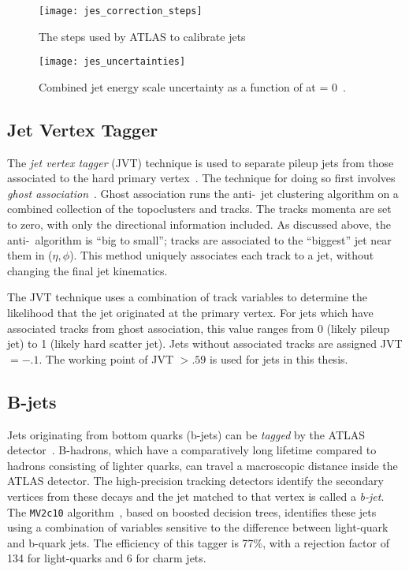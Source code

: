 \begin{figure}
\caption{The steps used by ATLAS to calibrate jets} \label{fig:jes_correction_steps}
\texttt{[image: jes\_correction\_steps]}
\end{figure}


\begin{figure}
\caption{Combined jet energy scale uncertainty as a function of \pt at \eta = 0~\cite{ATL-PHYS-PUB-2015-014,ATL-PHYS-PUB-2015-015}.} \label{fig:jes_uncertainties}
\texttt{[image: jes\_uncertainties]}
\end{figure}

\subsection{Jet Vertex Tagger}

The \textit{jet vertex tagger} (JVT) technique is used to separate pileup jets from those associated to the hard primary vertex~\cite{ATLAS-CONF-2014-018}.
The technique for doing so first involves \textit{ghost association}~\cite{Cacciari:2008gn}.
Ghost association runs the anti-\kt~jet clustering algorithm on a combined collection of the topoclusters and tracks.
The tracks momenta are set to zero\footnotemark, with only the directional information included.
As discussed above, the anti-\kt~algorithm is ``big to small'';  tracks are associated to the ``biggest'' jet near them in ($\eta, \phi$).
This method uniquely associates each track to a jet, without changing the final jet kinematics.

The JVT technique uses a combination of track variables to determine the likelihood that the jet originated at the primary vertex.
For jets which have associated tracks from ghost association, this value ranges from 0 (likely pileup jet) to 1 (likely hard scatter jet).
Jets without associated tracks are assigned JVT $= -.1$.
The  working point of JVT $ > .59$ is used for jets in this thesis.

\subsection{B-jets}

Jets originating from bottom quarks (b-jets) can be \textit{tagged} by the ATLAS detector~\cite{Aad:2015ydr,ATL-PHYS-PUB-2016-012}.
B-hadrons, which have a comparatively long lifetime compared to hadrons consisting of lighter quarks, can travel a macroscopic distance inside the ATLAS detector.
The high-precision tracking detectors identify the secondary vertices from these decays and the jet matched to that vertex is called a \textit{b-jet}.
The \texttt{MV2c10} algorithm~\cite{Aad:2015ydr,ATL-PHYS-PUB-2016-012}, based on boosted decision trees, identifies these jets using a combination of variables sensitive to the difference between light-quark and b-quark jets.
The efficiency of this tagger is 77\%, with a rejection factor of 134 for light-quarks and 6 for charm jets.

